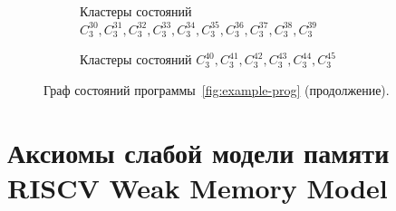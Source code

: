 \begin{figure}[H]
  \ContinuedFloat
  \begin{subfigure}{0.95\textwidth}
    \centerfloat{}
    \caption{Кластеры состояний $C_{3}^{30}, C_{3}^{31}, C_{3}^{32},
      C_{3}^{33}, C_{3}^{34}, C_{3}^{35}, C_{3}^{36}, C_{3}^{37},
    C_{3}^{38}, C_{3}^{39}$}
    \label{fig:cluster-30-31-32-33-34-35-36-37-38-39}
  \end{subfigure}

  \vspace{5mm}

  \begin{subfigure}{0.95\textwidth}
    \centerfloat{}
    \caption{Кластеры состояний $C_{3}^{40}, C_{3}^{41}, C_{3}^{42},
    C_{3}^{43}, C_{3}^{44}, C_{3}^{45}$}
    \label{fig:cluster-40-41-42-43-44-45}
  \end{subfigure}

  \caption{Граф состояний программы~\ref{fig:example-prog} (продолжение).}
  \label{fig:full-sg-for-prog-cnt2}
\end{figure}



\chapter{Аксиомы слабой модели памяти RISCV Weak Memory Model}\label{app:rvwmo}

\begingroup

\endgroup

\begingroup

\endgroup


